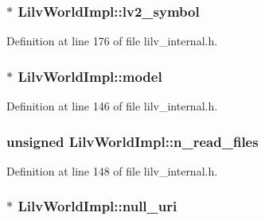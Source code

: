 \subsubsection[{\texorpdfstring{lv2\+\_\+symbol}{lv2_symbol}}]{$\ast$ Lilv\+World\+Impl\+::lv2\+\_\+symbol}\hypertarget{struct_lilv_world_impl_a6dc1e99491e637a1188ee3d3d2aa6fad}{}\label{struct_lilv_world_impl_a6dc1e99491e637a1188ee3d3d2aa6fad}


Definition at line 176 of file lilv\+\_\+internal.\+h.

\subsubsection[{\texorpdfstring{model}{model}}]{$\ast$ Lilv\+World\+Impl\+::model}\hypertarget{struct_lilv_world_impl_a02f0eae0ade595968f72e721607b1e17}{}\label{struct_lilv_world_impl_a02f0eae0ade595968f72e721607b1e17}


Definition at line 146 of file lilv\+\_\+internal.\+h.

\subsubsection[{\texorpdfstring{n\+\_\+read\+\_\+files}{n_read_files}}]{\setlength{\rightskip}{0pt plus 5cm}unsigned Lilv\+World\+Impl\+::n\+\_\+read\+\_\+files}\hypertarget{struct_lilv_world_impl_a5d4e571898e7420c1d01c98a5e291853}{}\label{struct_lilv_world_impl_a5d4e571898e7420c1d01c98a5e291853}


Definition at line 148 of file lilv\+\_\+internal.\+h.

\subsubsection[{\texorpdfstring{null\+\_\+uri}{null_uri}}]{$\ast$ Lilv\+World\+Impl\+::null\+\_\+uri}\hypertarget{struct_lilv_world_impl_a9ff8c34d74cf884e8b7946fb72af7e23}{}\label{struct_lilv_world_impl_a9ff8c34d74cf884e8b7946fb72af7e23}


